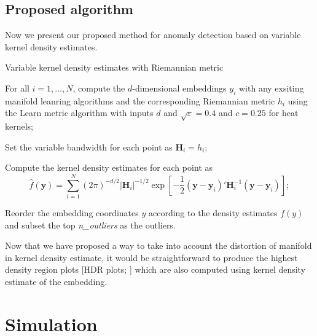 \documentclass[11pt,a4paper,]{article}
\begin{document}
\hypertarget{proposed-algorithm}{%
\subsection{Proposed algorithm}\label{proposed-algorithm}}

Now we present our proposed method for anomaly detection based on variable kernel density estimates.

\begin{algorithm}[!htb]
  \caption{Variable kernel density estimates with Riemannian metric}
  \label{alg:vkderm}
  \DontPrintSemicolon
  \SetAlgoLined
  \BlankLine
  \begin{algorithmic}[1]

  \STATE For all $i=1,\ldots,N$, compute the $d$-dimensional embeddings $y_i$ with any exsiting manifold leanring algorithms and the corresponding Riemannian metric $h_i$ using the Learn metric algorithm with inputs $d$ and $\sqrt{\varepsilon} = 0.4$ and $c=0.25$ for heat kernels;

  \STATE Set the variable bandwidth for each point as $\pmb{H}_i = h_i$;

  \STATE Compute the kernel density estimates for each point as
  $$
  \hat{f}(\pmb{y})=\sum\limits_{i=1}^N (2\pi)^{-d/2}|\pmb{H}_i|^{-1/2}\exp\left[-\frac{1}{2}(\pmb{y}-\pmb{y}_i)'\pmb{H}_i^{-1}(\pmb{y}-\pmb{y}_i)\right];
  $$

  \STATE Reorder the embedding coordinates $y$ according to the density estimates $f(y)$ and subset the top \textit{n\_outliers} as the outliers.

  \end{algorithmic}
\end{algorithm}

Now that we have proposed a way to take into account the distortion of manifold in kernel density estimate, it would be straightforward to produce the highest density region plots {[}HDR plots; \textcite{Hyndman1996-lk}{]} which are also computed using kernel density estimate of the embedding.

\hypertarget{simulation}{%
\section{Simulation}\label{simulation}}
\end{document}
